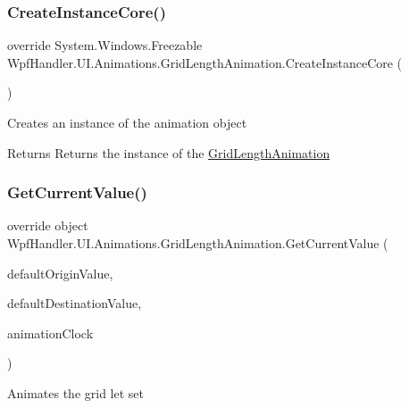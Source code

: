 \subsubsection{\texorpdfstring{Create\+Instance\+Core()}{CreateInstanceCore()}}
{\footnotesize\ttfamily override System.\+Windows.\+Freezable Wpf\+Handler.\+U\+I.\+Animations.\+Grid\+Length\+Animation.\+Create\+Instance\+Core (\begin{DoxyParamCaption}{ }\end{DoxyParamCaption})\hspace{0.3cm}{\ttfamily [protected]}}



Creates an instance of the animation object 

\begin{DoxyReturn}{Returns}
Returns the instance of the \mbox{\hyperlink{class_wpf_handler_1_1_u_i_1_1_animations_1_1_grid_length_animation}{Grid\+Length\+Animation}}
\end{DoxyReturn}
\mbox{\label{class_wpf_handler_1_1_u_i_1_1_animations_1_1_grid_length_animation_ae2f932054a13cdbe756f997ca4981708}} 
\subsubsection{\texorpdfstring{Get\+Current\+Value()}{GetCurrentValue()}}
{\footnotesize\ttfamily override object Wpf\+Handler.\+U\+I.\+Animations.\+Grid\+Length\+Animation.\+Get\+Current\+Value (\begin{DoxyParamCaption}\item[{object}]{default\+Origin\+Value,  }\item[{object}]{default\+Destination\+Value,  }\item[{Animation\+Clock}]{animation\+Clock }\end{DoxyParamCaption})}



Animates the grid let set 


